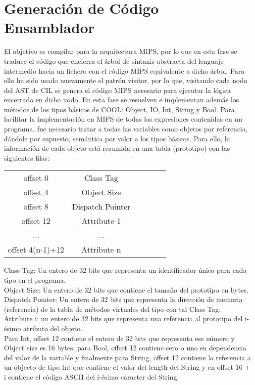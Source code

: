 \documentclass[]{article}
\begin{document}
\section{Generaci\'on de C\'odigo Ensamblador}
El objetivo es compilar para la arquitectura MIPS, por lo que en esta fase se traduce el c\'odigo que encierra el \'arbol de sintaxis abstracta del lenguaje intermedio hacia un fichero con el c\'odigo MIPS equivalente a dicho \'arbol. Para ello ha sido usado nuevamente el patr\'on visitor, por lo que, visitando cada nodo del AST de CIL se genera el c\'odigo MIPS necesario para ejecutar la l\'ogica encerrada en dicho nodo. En esta fase se resuelven e implementan adem\'as los m\'etodos de los tipos b\'asicos de COOL: Object, IO, Int, String y Bool. Para facilitar la implementaci\'on en MIPS de todas las expresiones contenidas en un programa, fue necesario tratar a todas las variables como objetos por referencia, d\'andole por supuesto, sem\'antica por valor a los tipos b\'asicos. Para ello, la informaci\'on de cada objeto est\'a resumida en una tabla (prototipo) con las siguientes filas:\\
\begin{center}
\begin{tabular}{cccccc}
	offset 0 & Class Tag\\
	offset 4 & Object Size\\
	offset 8 & Dispatch Pointer\\
	offset 12 & Attribute 1 \\
	... & ... \\
	offset 4(n-1)+12 & Attribute n \\
\end{tabular}
\end{center}
Class Tag: Un entero de 32 bits que representa un identificador \'unico para cada tipo en el programa.\\
Object Size: Un entero de 32 bits que contiene el tama\~no del prototipo en bytes.\\
Dispatch Pointer: Un entero de 32 bits que representa la direcci\'on de memoria (referencia) de la tabla de m\'etodos virtuales del tipo con tal Class Tag.\\
Attribute i: un entero de 32 bits que representa una referencia al prototipo del i-\'esimo atributo del objeto.\\

Para Int, offset 12 contiene el entero de 32 bits que representa ese n\'umero y Object size es 16 bytes, para Bool, offset 12 contiene cero o uno en dependencia del valor de la variable y finalmente para String, offset 12 contiene la referencia a un objecto de tipo Int que contiene el valor del length del String y en offset 16 + i contiene el c\'odigo ASCII del i-\'esimo caracter del String.
\end{document}
